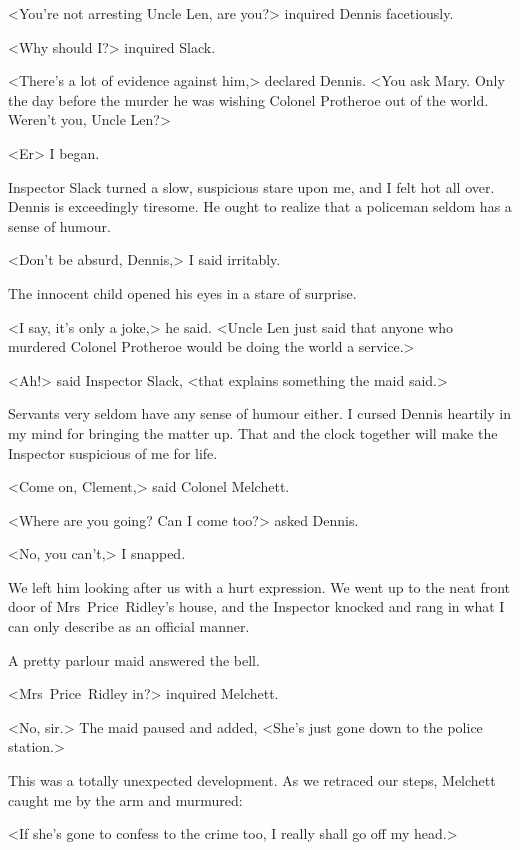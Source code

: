 <You're not arresting Uncle Len, are you?> inquired Dennis facetiously.

<Why should I?> inquired Slack.

<There's a lot of evidence against him,> declared Dennis. <You ask Mary. Only the day before the murder he was wishing Colonel Protheroe out of the world. Weren't you, Uncle Len?>

<Er\longdash> I began.

Inspector Slack turned a slow, suspicious stare upon me, and I felt hot all over. Dennis is exceedingly tiresome. He ought to realize that a policeman seldom has a sense of humour.

<Don't be absurd, Dennis,> I said irritably.

The innocent child opened his eyes in a stare of surprise.

<I say, it's only a joke,> he said. <Uncle Len just said that anyone who murdered Colonel Protheroe would be doing the world a service.>

<Ah!> said Inspector Slack, <that explains something the maid said.>

Servants very seldom have any sense of humour either. I cursed Dennis heartily in my mind for bringing the matter up. That and the clock together will make the Inspector suspicious of me for life.

<Come on, Clement,> said Colonel Melchett.

<Where are you going? Can I come too?> asked Dennis.

<No, you can't,> I snapped.

We left him looking after us with a hurt expression. We went up to the neat front door of Mrs~Price~Ridley's house, and the Inspector knocked and rang in what I can only describe as an official manner.

A pretty parlour maid answered the bell.

<Mrs~Price~Ridley in?> inquired Melchett.

<No, sir.> The maid paused and added, <She's just gone down to the police station.>

This was a totally unexpected development. As we retraced our steps, Melchett caught me by the arm and murmured:

<If she's gone to confess to the crime too, I really shall go off my head.>
